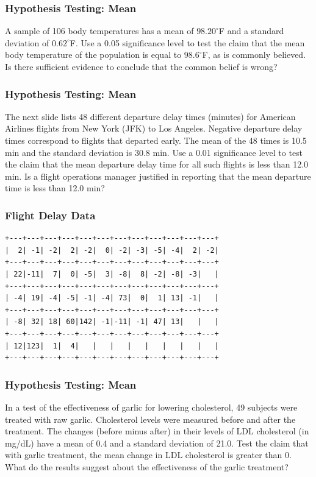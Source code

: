 \documentclass[xcolor=dvipsnames]{beamer}
\begin{document}
\begin{frame}
  \frametitle{Hypothesis Testing: Mean}
  {\ubung} A sample of 106 body temperatures has a
  mean of $98.20^{\circ}$F and a standard
  deviation of $0.62^{\circ}$F. Use a 0.05
  significance level to test the claim that
  the mean body temperature of the
  population is equal to $98.6^{\circ}$F, as
  is commonly believed. Is there sufficient
  evidence to conclude that the common
  belief is wrong?
\end{frame}

\begin{frame}
  \frametitle{Hypothesis Testing: Mean}
  {\ubung} The next slide lists 48
  different departure delay times
  (minutes) for American Airlines
  flights from New York (JFK) to
  Los Angeles. Negative departure
  delay times correspond to
  flights that departed early.
  The mean of the 48 times is
  10.5 min and the standard
  deviation is 30.8 min. Use a
  0.01 significance level to test
  the claim that the mean
  departure delay time for all
  such flights is less than 12.0
  min. Is a flight operations
  manager justified in reporting
  that the mean departure time is
  less than 12.0 min?
\end{frame}

\begin{frame}[fragile]
  \frametitle{Flight Delay Data}
\begin{verbatim}
+---+---+---+---+---+---+---+---+---+---+---+---+
|  2| -1| -2|  2| -2|  0| -2| -3| -5| -4|  2| -2|
+---+---+---+---+---+---+---+---+---+---+---+---+
| 22|-11|  7|  0| -5|  3| -8|  8| -2| -8| -3|   |
+---+---+---+---+---+---+---+---+---+---+---+---+
| -4| 19| -4| -5| -1| -4| 73|  0|  1| 13| -1|   |
+---+---+---+---+---+---+---+---+---+---+---+---+
| -8| 32| 18| 60|142| -1|-11| -1| 47| 13|   |   |
+---+---+---+---+---+---+---+---+---+---+---+---+
| 12|123|  1|  4|   |   |   |   |   |   |   |   |
+---+---+---+---+---+---+---+---+---+---+---+---+
\end{verbatim}
\end{frame}

\begin{frame}
  \frametitle{Hypothesis Testing:
    Mean}
  {\ubung} In a test of the effectiveness of garlic for lowering
  cholesterol, 49 subjects were treated with raw garlic.
  Cholesterol levels were measured before and after the treatment.
  The changes (before minus after) in their levels of LDL
  cholesterol (in mg/dL) have a mean of 0.4 and a standard
  deviation of 21.0. Test the claim that with garlic treatment,
  the mean change in LDL cholesterol is greater than 0. What do
  the results suggest about the effectiveness of the garlic
  treatment?
\end{frame}
\end{document}
